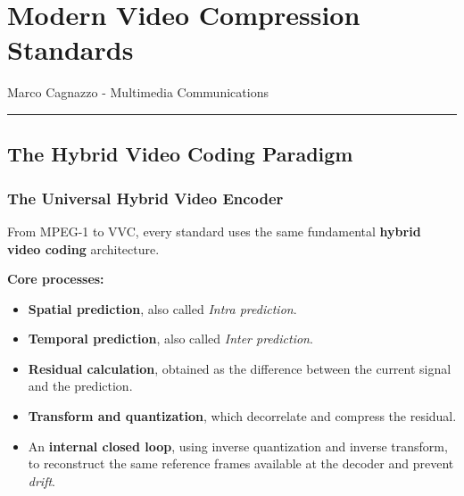 \chapter{Modern Video Compression Standards}

Marco Cagnazzo - Multimedia Communications

\bigskip\hrule\bigskip

\section{The Hybrid Video Coding Paradigm}

\subsection{The Universal Hybrid Video Encoder}

From MPEG-1 to VVC, every standard uses the same fundamental \textbf{hybrid video coding} architecture.

\textbf{Core processes:}

\begin{itemize}
\item \textbf{Spatial prediction}, also called \textit{Intra prediction}.
\item \textbf{Temporal prediction}, also called \textit{Inter prediction}.
\item \textbf{Residual calculation}, obtained as the difference between the current signal and the prediction.
\item \textbf{Transform and quantization}, which decorrelate and compress the residual.
\item An \textbf{internal closed loop}, using inverse quantization and inverse transform, to reconstruct the same reference frames available at the decoder and prevent \textit{drift}.
\end{itemize}

